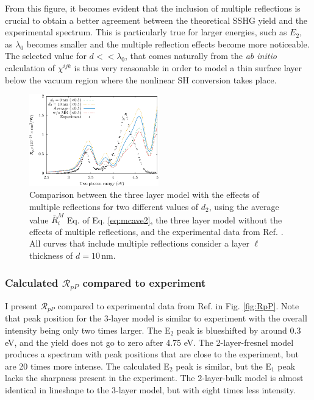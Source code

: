 From this figure, it becomes evident that the inclusion of multiple reflections is crucial to obtain a better agreement between the theoretical SSHG yield and the experimental spectrum. This is particularly true for larger energies, such as $E_{2}$, as $\lambda_{0}$ becomes smaller and the multiple reflection effects become more noticeable. The selected value for $d << \lambda_{0}$, that comes naturally from the \emph{ab initio} calculation of $\chi^{ijk}$ is thus very reasonable in order to model a thin surface layer below the vacuum region where the nonlinear SH conversion takes place.

\begin{figure}[H]
\centering
\includegraphics[width=0.5\textwidth]{content/figures/fig-Si1x1-MRdepth}
\caption{Comparison between the three layer model with the effects of multiple reflections for two different values of $d_{2}$, using the average value $\bar{R}^{M}_{i}$ Eq. of Eq. \eqref{eq:mcave2}, the three layer model without the effects of multiple reflections, and the experimental data from Ref. \cite{mejiaPRB02}. All curves that include multiple reflections consider a layer $\ell$ thickness of $d = 10\,\mathrm{nm}$.}
\label{fig:d2values}
\end{figure}


\subsubsection{Calculated \texorpdfstring{$\mathcal{R}_{pP}$}{RpP} compared to
experiment}

I present $\mathcal{R}_{pP}$ compared to experimental data from Ref. \cite{mejiaPRB02} in Fig. \ref{fig:RpP}. Note that peak position for the 3-layer model is similar to experiment with the overall intensity being only two times larger. The E$_{2}$ peak is blueshifted by around 0.3 eV, and the yield does not go to zero after 4.75 eV. The 2-layer-fresnel model produces a spectrum with peak positions that are close to the experiment, but are 20 times more intense. The calculated E$_{2}$ peak is similar, but the E$_{1}$ peak lacks the sharpness present in the experiment. The 2-layer-bulk model is almost identical in lineshape to the 3-layer model, but with eight times less intensity.

